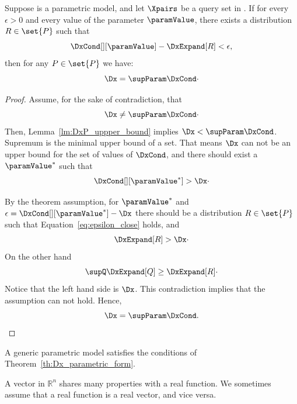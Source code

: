 \begin{theorem}
    \label{th:Dx_parametric_form}
    Suppose \pmodel is a parametric model, and let $\Xpairs$ be a query set in \Mt.
    If for every $\epsilon > 0$ and every value of the parameter $\paramValue$, there exists a distribution $R \in \set{P}$
    such that
    \begin{equation}
        \DxCond[][\paramValue] - \DxExpand[R]  < \epsilon,
        \label{eq:epsilon_close}
    \end{equation}
    then for any $P \in \set{P}$ we have:
    \begin{equation}
        \Dx = \supParam \DxCond  \cdot
        \label{eq:div_parametric}
    \end{equation}
    \label{th:div_for_parametric}
\end{theorem}

\begin{proof}
    Assume, for the sake of contradiction, that
    \[
        \Dx \neq \supParam \DxCond \cdot
    \]
    Then, Lemma~\ref{lm:DxP_uppper_bound} implies $\Dx < \supParam \DxCond$.
    Supremum is the minimal upper bound of a set.
    That means $\Dx$ can not be an upper bound for the set of values of $\DxCond$,
    and there should exist a $\paramValue^{*}$ such that
    \[
        \DxCond[][\paramValue^{*}] > \Dx \cdot
    \]

    By the theorem assumption, for $\paramValue^{*}$ and $\epsilon = \DxCond[][\paramValue^{*}] - \Dx$ there should be a
    distribution $R \in \set{P}$ such that Equation~\ref{eq:epsilon_close} holds, and
    \begin{align*}
        \DxExpand[R] > \Dx  \cdot
    \end{align*}
    On the other hand
    \[
        \supQ \DxExpand[Q] \geq \DxExpand[R] \cdot
    \]
    Notice that the left hand side is $\Dx$.
    This contradiction implies that the assumption can not hold.
    Hence,
    \[
        \Dx = \supParam \DxCond. \qedhere
    \]
\end{proof}

\begin{proposition}
    A generic parametric model satisfies the conditions of Theorem~\ref{th:Dx_parametric_form}.
\end{proposition}


A vector in $\mathbb {R}^{n}$ shares many properties with a real function.
We sometimes assume that a real function is a real vector, and vice versa.



